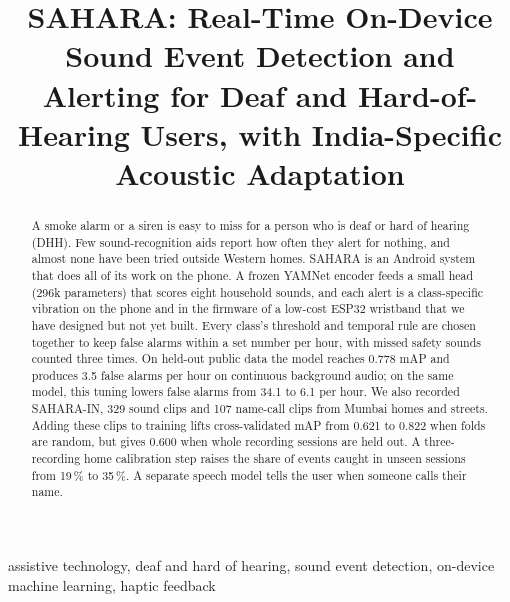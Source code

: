 \documentclass[conference,a4paper]{IEEEtran}
\begin{document}
\title{SAHARA: Real-Time On-Device Sound Event Detection and Alerting for Deaf and Hard-of-Hearing Users, with India-Specific Acoustic Adaptation}

\author{
}

\maketitle

\begin{abstract}
A smoke alarm or a siren is easy to miss for a person who is deaf or hard of hearing (DHH). Few sound-recognition aids report how often they alert for nothing, and almost none have been tried outside Western homes. SAHARA is an Android system that does all of its work on the phone. A frozen YAMNet encoder feeds a small head (296k parameters) that scores eight household sounds, and each alert is a class-specific vibration on the phone and in the firmware of a low-cost ESP32 wristband that we have designed but not yet built. Every class's threshold and temporal rule are chosen together to keep false alarms within a set number per hour, with missed safety sounds counted three times. On held-out public data the model reaches 0.778 mAP and produces 3.5 false alarms per hour on continuous background audio; on the same model, this tuning lowers false alarms from 34.1 to 6.1 per hour. We also recorded SAHARA-IN, 329 sound clips and 107 name-call clips from Mumbai homes and streets. Adding these clips to training lifts cross-validated mAP from 0.621 to 0.822 when folds are random, but gives 0.600 when whole recording sessions are held out. A three-recording home calibration step raises the share of events caught in unseen sessions from 19\,\% to 35\,\%. A separate speech model tells the user when someone calls their name.
\end{abstract}

\begin{IEEEkeywords}
assistive technology, deaf and hard of hearing, sound event detection, on-device machine learning, haptic feedback
\end{IEEEkeywords}
\end{document}
